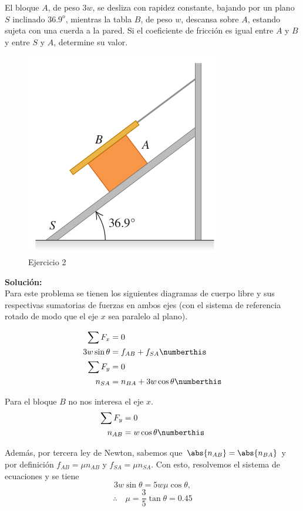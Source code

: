\begin{mdframed}[style=warning]
	\begin{ejercicio}
		El bloque $A$, de peso $3w$, se desliza con rapidez constante, bajando por un plano $S$ inclinado $36.9^o$, mientras la tabla $B$, de peso $w$, descansa sobre $A$, estando sujeta con una cuerda a la pared. Si el coeficiente de fricción es igual entre $A$ y $B$ y entre $S$ y $A$, determine su valor.
		\begin{figure}[H]
			\centering
			\includegraphics[scale=0.35]{./img/599.png}
			\caption{Ejercicio 2}
			\label{599}
		\end{figure}
	\end{ejercicio}
	\noindent \textbf{Solución: } \\
	Para este problema se tienen los siguientes diagramas de cuerpo libre y sus respectivas sumatorias de fuerzas en ambos ejes (con el sistema de referencia rotado de modo que el eje $x$ sea paralelo al plano).
	\begin{multicols}{2}
		
		\begin{align*}
			\sum F_x &= 0 \\
			3w\sin{\theta} &= f_{AB} + f_{SA} \numberthis \label{ej2_dclA_x} \\
			\sum F_y &= 0 \\
			n_{SA} &= n_{BA} + 3w\cos{\theta} \numberthis \label{ej2_dclA_y}
		\end{align*}
		\columnbreak
		
		Para el bloque $B$ no nos interesa el eje $x$.
		\begin{align*}
			\sum F_y &= 0 \\
			n_{AB} &= w\cos{\theta} \numberthis \label{ej2_dclB_y}
		\end{align*}
	\end{multicols}
	Además, por tercera ley de Newton, sabemos que $\abs{n_{AB}} = \abs{n_{BA}}$ y por definición $f_{AB} = \mu n_{AB}$ y $f_{SA} = \mu n_{SA}$. Con esto, resolvemos el sistema de ecuaciones y se tiene
		$$ 3w\sin{\theta} = 5w\mu \cos{\theta}, $$
		$$ \therefore \quad \boxed{ \mu = \frac{3}{5} \tan{\theta} = 0.45 } $$
\end{mdframed}







